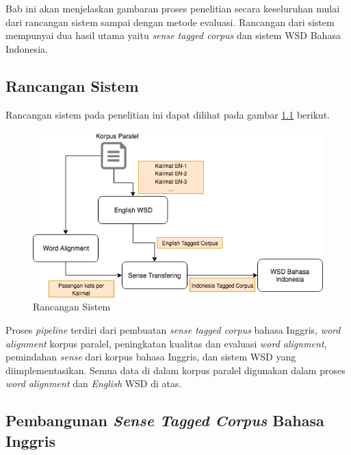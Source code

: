 \chapter{\babTiga}
Bab ini akan menjelaskan gambaran proses penelitian secara keseluruhan mulai dari rancangan sistem sampai dengan metode evaluasi. Rancangan dari sistem mempunyai dua hasil utama yaitu \textit{sense tagged corpus} dan sistem WSD Bahasa Indonesia.

\section{Rancangan Sistem}

Rancangan sistem pada penelitian ini dapat dilihat pada gambar \ref{fig:Rancangan-Sistem} berikut.

\begin{figure}
	\centering
	\includegraphics[width=1\linewidth]{adit_pics/WSD-full.png}
	\caption{Rancangan Sistem}
	\label{fig:Rancangan-Sistem}
\end{figure}

Proses \textit{pipeline} terdiri dari pembuatan \textit{sense tagged corpus} bahasa Inggris,  \textit{word alignment} korpus paralel, peningkatan kualitas dan evaluasi \textit{word alignment}, pemindahan \textit{sense} dari korpus bahasa Inggris, dan sistem WSD yang diimplementasikan. Semua data di dalam korpus paralel digunakan dalam proses \textit{word alignment} dan \textit{English} WSD di atas.

\section{Pembangunan \textit{Sense Tagged Corpus} Bahasa Inggris}

